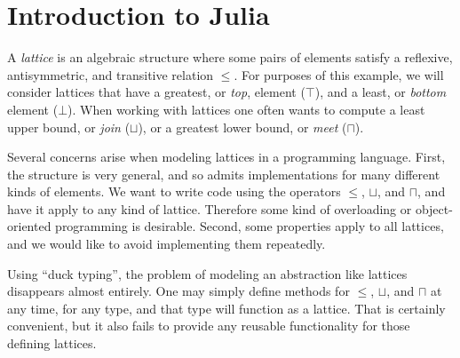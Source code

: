 


\iffalse

\section{Introduction to Julia}

A \emph{lattice} is an algebraic structure where some pairs of elements
satisfy a reflexive, antisymmetric, and transitive relation $\leq$.
For purposes of this example, we will consider lattices that have
a greatest, or \emph{top}, element ($\top$), and a least, or \emph{bottom}
element ($\bot$).
When working with lattices one often wants to compute
a least upper bound, or \emph{join} ($\sqcup$), or a greatest lower bound,
or \emph{meet} ($\sqcap$).

Several concerns arise when modeling lattices in a programming language.
First, the structure is very general, and so admits implementations
for many different kinds of elements.
We want to write code using the operators $\leq$, $\sqcup$, and $\sqcap$, and
have it apply to any kind of lattice.
Therefore some kind of overloading or object-oriented programming
is desirable.
Second, some properties apply to all lattices, and we would
like to avoid implementing them repeatedly.

Using ``duck typing'', the problem of modeling an abstraction like lattices
disappears almost entirely.
One may simply define methods for $\leq$, $\sqcup$, and $\sqcap$ at any time,
for any type, and that type will function as a lattice.
That is certainly convenient, but it also fails to provide any reusable
functionality for those defining lattices.

